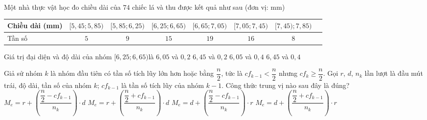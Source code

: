 

\begin{ex}%
	Một nhà thực vật học đo chiều dài của $74$ chiếc lá và thu được kết quả như sau (đơn vị: mm) 
	\begin{center}
		\begin{tabular}{|l|c|c|c|c|c|c|c|}
			\hline Chiều dài (mm)  & {$[5{,}45;5{,}85)$} & {$ [5{,}85;6{,}25)$} & {$[6{,}25;6{,}65) $} & {$[6{,}65;7{,}05)$} & {$[7{,}05;7{,}45)$} & {$[7{,}45);7{,}85)$}\\
			\hline Tần số & $5$ & $9$ & $15$ &  $19$& $16$& $8$ \\
			\hline 
		\end{tabular}
	\end{center}
	Giá trị đại  diện và độ dài của nhóm $[6{,}25;6{,}65)$là
	 \choice
		{ $6{,}05$ và $0{,}2$} 
		 { $6{,}45$ và $0{,}2$}
		{ $6{,}05$ và $0{,}4$} 
		{  \True $6{,}45$ và $0{,}4$}
\end{ex}

\begin{ex}%
	Giả sử  nhóm $k$ là nhóm đầu tiên có tần số tích lũy lớn hơn hoặc bằng $\dfrac{n}{2}$, tức là $cf_{k-1} < \dfrac{n}{2}$ nhưng $cf_k \ge \dfrac{n}{2}$. Gọi $r$, $d$, $n_k$ lần lượt là đầu mút trái, độ dài, tần số của nhóm $k$; $cf_{k-1}$ là tần số tích lũy của nhóm $k-1$. Công thức trung vị nào sau đây là đúng?
	\choice 
		{\True $M_e=r+\left(\dfrac{\dfrac{n}{2}-cf_{k-1}}{n_k}  \right)\cdot d$}
		 {$M_e=r+\left(\dfrac{\dfrac{n}{2}+cf_{k-1}}{n_k} \right)\cdot d$}
		{$M_e=d+\left(\dfrac{\dfrac{n}{2}-cf_{k-1}}{n_k}  \right)\cdot r$}
		{$M_e=d+\left(\dfrac{\dfrac{n}{2}+cf_{k-1}}{n_k} \right)\cdot  r$}
	\loigiai{ 
	 }
\end{ex}

